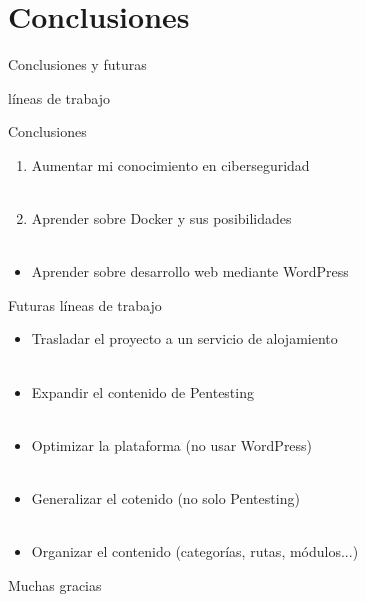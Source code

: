 \section{Conclusiones}

    \begin{frame}
        \Huge{\centerline{Conclusiones y futuras}}
        \Huge{\centerline{líneas de trabajo}}
    \end{frame}

    \begin{frame}{Conclusiones}
        \begin{enumerate}
            \item Aumentar mi conocimiento en ciberseguridad
            \\~\\
            \item Aprender sobre Docker y sus posibilidades
            \\~\\
        \end{enumerate}

        \begin{itemize}
            \item Aprender sobre desarrollo web mediante WordPress
        \end{itemize}
    \end{frame}

    \begin{frame}{Futuras líneas de trabajo}
        \begin{itemize}
            \item Trasladar el proyecto a un servicio de alojamiento
            \\~\\
            \item Expandir el contenido de Pentesting
            \\~\\
            \item Optimizar la plataforma (no usar WordPress)
            \\~\\
            \item Generalizar el cotenido (no solo Pentesting)
            \\~\\
            \item Organizar el contenido (categorías, rutas, módulos...)
        \end{itemize}
    \end{frame}

    \begin{frame}
        \Huge{\centerline{Muchas gracias}}
    \end{frame}
